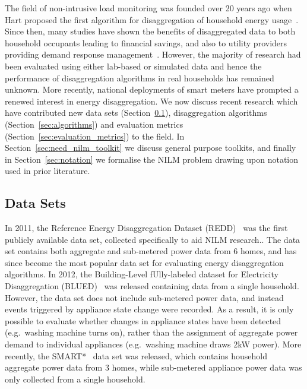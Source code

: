 \documentclass{sig-alternate}
\newcommand{\bluecolor}[1]{\textcolor{blue}{#1}}
\newcommand{\secref}[1]{Section~\ref{#1}}
\begin{document}
\noindent
The field of non-intrusive load monitoring was founded over 20 years ago when Hart proposed the first algorithm for disaggregation of household energy usage~\cite{hart_1992}. Since then, many studies have shown the benefits of disaggregated data to both household occupants leading to financial savings, and also to utility providers providing demand response management~\cite{zeifman_2011,armel_2013}. However, the majority of research had been evaluated using either lab-based or simulated data and hence the performance of disaggregation algorithms in real households has remained unknown. More recently, national deployments of smart meters have prompted a renewed interest in energy disaggregation. 
We now discuss recent research which have contributed new data sets (\secref{sec:datasets}), disaggregation algorithms (\secref{sec:algorithms}) and evaluation metrics (\secref{sec:evaluation_metrics}) to the field. 
In \secref{sec:need_nilm_toolkit} we discuss general purpose toolkits, and finally in \secref{sec:notation} we formalise the NILM problem drawing upon notation used in prior literature.

\subsection{Data Sets}
\label{sec:datasets}
\noindent In 2011, the Reference Energy Disaggregation Dataset (REDD)~\cite{redd} was the first publicly available data set, collected specifically to aid NILM research.. The data set contains both aggregate and sub-metered power data from 6 homes, and has since become the most popular data set for evaluating energy disaggregation algorithms. In 2012, the Building-Level fUlly-labeled dataset for Electricity Disaggregation (BLUED)~\cite{blued} was released containing data from a single household. However, the data set does not include sub-metered power data, and instead events triggered by appliance state change were recorded. 
As a result, it is only possible to evaluate whether changes in appliance states have been detected (e.g.\ washing machine turns on), rather than the assignment of aggregate power demand to individual appliances (e.g.\ washing machine draws 2kW power). More recently, the SMART*~\cite{smart} data set was released, which contains household aggregate power data from 3 homes, while sub-metered appliance power data was only collected from a single household.
\end{document}
